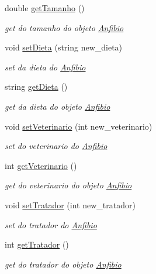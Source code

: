 \begin{DoxyCompactItemize}
double \mbox{\hyperlink{class_anfibio_a4040a81799cdd24294d4ee51d8f74b0c}{get\+Tamanho}} ()
\begin{DoxyCompactList}\small\item\em get do tamanho do objeto \mbox{\hyperlink{class_anfibio}{Anfibio}} \end{DoxyCompactList}\item 
void \mbox{\hyperlink{class_anfibio_aedba3c7a41c0a4410cde4d513973256e}{set\+Dieta}} (string new\+\_\+dieta)
\begin{DoxyCompactList}\small\item\em set da dieta do \mbox{\hyperlink{class_anfibio}{Anfibio}} \end{DoxyCompactList}\item 
string \mbox{\hyperlink{class_anfibio_a6e40c90ce1434b51619f5efba96cb7d7}{get\+Dieta}} ()
\begin{DoxyCompactList}\small\item\em get da dieta do objeto \mbox{\hyperlink{class_anfibio}{Anfibio}} \end{DoxyCompactList}\item 
void \mbox{\hyperlink{class_anfibio_ac1c7753e922600d12853f5209e65bfbc}{set\+Veterinario}} (int new\+\_\+veterinario)
\begin{DoxyCompactList}\small\item\em set do veterinario do \mbox{\hyperlink{class_anfibio}{Anfibio}} \end{DoxyCompactList}\item 
int \mbox{\hyperlink{class_anfibio_a427cc12c850b4e8b6ef09a080617c943}{get\+Veterinario}} ()
\begin{DoxyCompactList}\small\item\em get do veterinario do objeto \mbox{\hyperlink{class_anfibio}{Anfibio}} \end{DoxyCompactList}\item 
void \mbox{\hyperlink{class_anfibio_a211278b47e3736c699ffd08f3473ddf8}{set\+Tratador}} (int new\+\_\+tratador)
\begin{DoxyCompactList}\small\item\em set do tratador do \mbox{\hyperlink{class_anfibio}{Anfibio}} \end{DoxyCompactList}\item 
int \mbox{\hyperlink{class_anfibio_a7906eb56c2fd2d1c61b010f40f0c15be}{get\+Tratador}} ()
\begin{DoxyCompactList}\small\item\em get do tratador do objeto \mbox{\hyperlink{class_anfibio}{Anfibio}} \end{DoxyCompactList}\item 

\end{DoxyCompactItemize}
